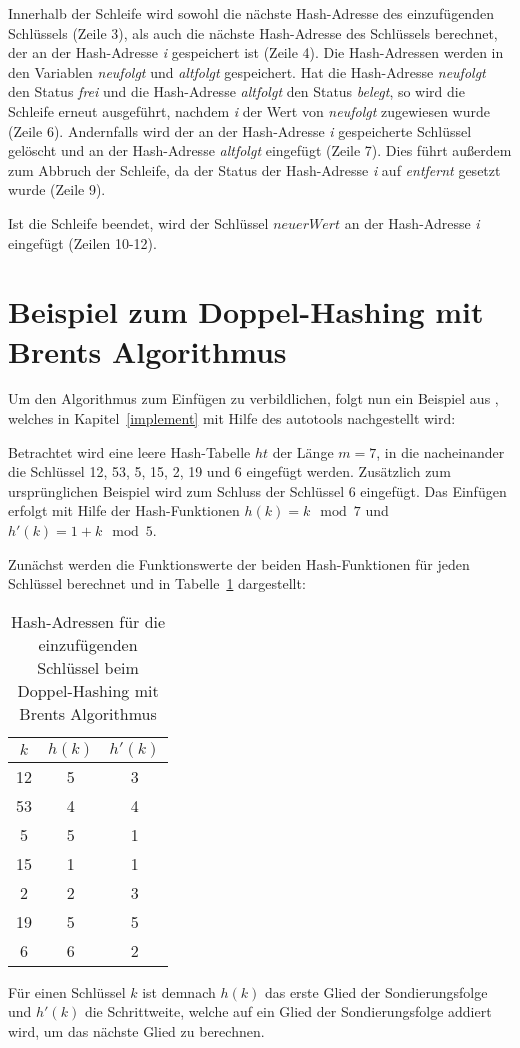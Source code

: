 Innerhalb der Schleife wird sowohl die nächste Hash-Adresse des einzufügenden Schlüssels (Zeile 3), als auch die nächste Hash-Adresse des Schlüssels berechnet, der an der Hash-Adresse \textit{i} gespeichert ist (Zeile 4). Die Hash-Adressen werden in den Variablen \textit{neufolgt} und \textit{altfolgt} gespeichert. Hat die Hash-Adresse \textit{neufolgt} den Status \textit{frei} und die Hash-Adresse \textit{altfolgt} den Status \textit{belegt}, so wird die Schleife erneut ausgeführt, nachdem \textit{i} der Wert von \textit{neufolgt} zugewiesen wurde (Zeile 6). Andernfalls wird der an der Hash-Adresse \textit{i} gespeicherte Schlüssel gelöscht und an der Hash-Adresse \textit{altfolgt} eingefügt (Zeile 7). Dies führt außerdem zum Abbruch der Schleife, da der Status der Hash-Adresse \textit{i} auf \textit{entfernt} gesetzt wurde (Zeile 9).

Ist die Schleife beendet, wird der Schlüssel \(neuerWert\) an der Hash-Adresse \textit{i} eingefügt (Zeilen 10-12). 

\section{Beispiel zum Doppel-Hashing mit Brents Algorithmus}\label{examplebrent}
Um den Algorithmus zum Einfügen zu verbildlichen, folgt nun ein Beispiel aus \cite[S.~214]{ADSOttWid}, welches in Kapitel~\ref{implement} mit Hilfe des autotools nachgestellt wird: 

Betrachtet wird eine leere Hash-Tabelle \(ht\) der Länge \(m=7\), in die nacheinander die Schlüssel 12, 53, 5, 15, 2, 19 und 6 eingefügt werden. Zusätzlich zum ursprünglichen Beispiel wird zum Schluss der Schlüssel 6 eingefügt. Das Einfügen erfolgt mit Hilfe der Hash-Funktionen \(h(k)=k\mod{7}\) und \(h'(k)=1+k\mod{5}\). 

Zunächst werden die Funktionswerte der beiden Hash-Funktionen für jeden Schlüssel berechnet und in Tabelle~\ref{tab:hashwerte_b} dargestellt:
\begin{table}[H]
	\centering
	\begin{tabular}{|c|c|c|}
		\hline
		\(k\) & \(h(k)\) & \(h'(k)\) \\ \hline
		12 & 5 & 3 \\
		53 & 4 & 4 \\
		5 & 5 & 1 \\
		15 & 1 & 1 \\
		2 & 2 & 3 \\
		19 & 5 & 5 \\
		6 & 6 & 2 \\ \hline
	\end{tabular}
	\caption{Hash-Adressen für die einzufügenden Schlüssel beim Doppel-Hashing mit Brents Algorithmus}
	\label{tab:hashwerte_b}
\end{table}
Für einen Schlüssel \(k\) ist demnach \(h(k)\) das erste Glied der Sondierungsfolge und \(h'(k)\) die Schrittweite, welche auf ein Glied der Sondierungsfolge addiert wird, um das nächste Glied zu berechnen.

